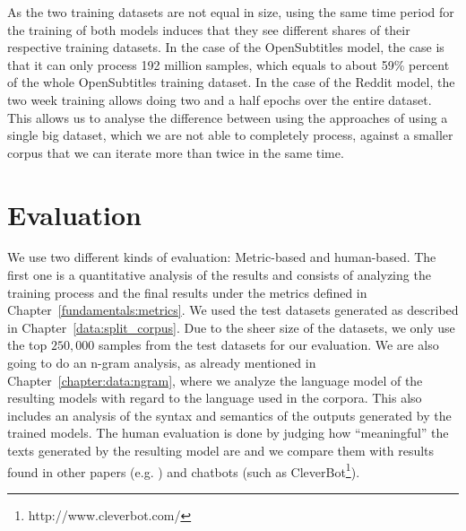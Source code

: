 As the two training datasets are not equal in size, using the same time period for the training of both models induces that they see different shares of their respective training datasets. In the case of the OpenSubtitles model, the case is that it can only process 192 million samples, which equals to about 59\% percent of the whole OpenSubtitles training dataset. In the case of the Reddit model, the two week training allows doing two and a half epochs over the entire dataset. This allows us to analyse the difference between using the approaches of using a single big dataset, which we are not able to completely process, against a smaller corpus that we can iterate more than twice in the same time.

\section{Evaluation}
\label{methods:evaluation}
We use two different kinds of evaluation: Metric-based and human-based. The first one is a quantitative analysis of the results and consists of analyzing the training process and the final results under the metrics defined in Chapter~\ref{fundamentals:metrics}. We used the test datasets generated as described in Chapter~\ref{data:split_corpus}. Due to the sheer size of the datasets, we only use the top $250,000$ samples from the test datasets for our evaluation. We are also going to do an n-gram analysis, as already mentioned in Chapter~\ref{chapter:data:ngram}, where we analyze the language model of the resulting models with regard to the language used in the corpora. This also includes an analysis of the syntax and semantics of the outputs generated by the trained models. The human evaluation is done by judging how ``meaningful'' the texts generated by the resulting model are and we compare them with results found in other papers (e.g. \cite{Vinyals:2015}) and chatbots (such as CleverBot\footnote{http://www.cleverbot.com/}).

